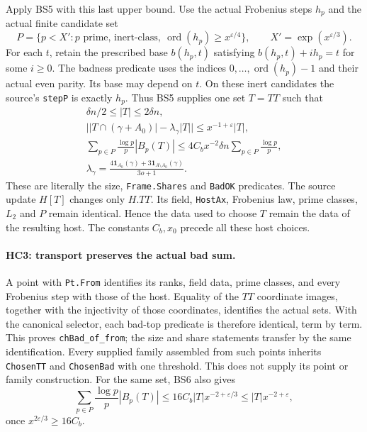 Apply BS5 with this last upper bound. Use the actual Frobenius steps
$h_p$ and the actual finite candidate set
\[
 P=\{p<X':p\text{ prime, inert-class},\
             \operatorname{ord}(h_p)\ge x^{\varepsilon/4}\},
 \qquad X'=\exp(x^{\varepsilon/3}).
\]
For each $t$, retain the prescribed base $b(h_p,t)$ satisfying
$b(h_p,t)+ih_p=t$ for some $i\ge0$. The badness predicate uses
the indices $0,\ldots,\operatorname{ord}(h_p)-1$ and their actual
even parity. Its base may depend on $t$. On these inert candidates
the source's \texttt{stepP} is exactly $h_p$. Thus BS5 supplies one
set $T=TT$ such that
\[
 \begin{gathered}
 \delta n/2\le |T|\le2\delta n,\\
 \bigl||T\cap(\gamma+A_0)|-\lambda_\gamma|T|\bigr|
       \le x^{-1+\varepsilon}|T|,\\
 \sum_{p\in P}\frac{\log p}{p}|B_p(T)|
       \le4C_bx^{-2}\delta n\sum_{p\in P}\frac{\log p}{p},\\
 \lambda_\gamma=
 \frac{4\mathbf1_{A_0}(\gamma)+3\mathbf1_{A\setminus A_0}(\gamma)}{3o+1}.
 \end{gathered}                                      \tag{HC.3}
\]
These are literally the size, \texttt{Frame.Shares} and
\texttt{BadOK} predicates. The source update $H[T]$ changes only
$H.TT$. Its field, \texttt{HostAx}, Frobenius law, prime classes,
$L_2$ and $P$ remain identical. Hence the data used to choose $T$
remain the data of the resulting host. The constants $C_b,x_0$
precede all these host choices.

\paragraph{HC3: transport preserves the actual bad sum.}
A point with \texttt{Pt.From} identifies its ranks, field data,
prime classes, and every Frobenius step with those of the host.
Equality of the $TT$ coordinate images, together with the
injectivity of those coordinates, identifies the actual sets.
With the canonical selector, each bad-top predicate is therefore
identical, term by term. This proves \texttt{chBad\_of\_from};
the size and share statements transfer by the same identification.
Every supplied family assembled from such points inherits
\texttt{ChosenTT} and \texttt{ChosenBad} with one threshold.
This does not supply its point or family construction.
For the same set, BS6 also gives
\[
 \sum_{p\in P}\frac{\log p}{p}|B_p(T)|
 \le16C_b|T|x^{-2+\varepsilon/3}
 \le |T|x^{-2+\varepsilon},                         \tag{HC.4}
\]
once $x^{2\varepsilon/3}\ge16C_b$.

